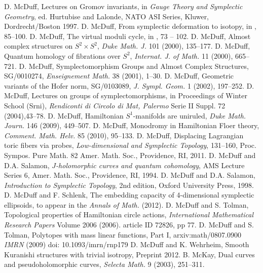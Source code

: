  D. McDuff, Lectures on Gromov invariants, in \emph{Gauge Theory and Symplectic Geometry}, ed. Hurtubise and Lalonde, NATO ASI Series, Kluwer, Dordrecht/Boston 1997.
 D. McDuff, From symplectic deformation to isotopy, in \cite{src-385}, 85--100.
 D. McDuff, The virtual moduli cycle, in \cite{src-99}, 73 -- 102.
 D. McDuff, Almost complex structures on $S^2\times S^2$, \emph{Duke Math. J.} 101 (2000), 135--177.
 D. McDuff, Quantum homology of fibrations over $S^2$, \emph{Internat. J. of Math.} 11 (2000), 665--721.
 D. McDuff, Symplectomorphism Groups and Almost Complex Structures, SG/0010274, \emph{Enseignement Math.} 38 (2001), 1--30.
 D. McDuff, Geometric variants of the Hofer norm, SG/0103089, \emph{J. Sympl. Geom.} 1 (2002), 197--252.
 D. McDuff, Lectures on groups of symplectomorphisms, in Proceedings of Winter School (Srni), \emph{Rendiconti di Circolo di Mat, Palermo} Serie II Suppl. 72 (2004),43--78.
 D. McDuff, Hamiltonian $S^1$-manifolds are uniruled, \emph{Duke Math. Journ.} 146 (2009), 449--507.
 D. McDuff, Monodromy in Hamiltonian Floer theory, \emph{Comment. Math. Helv.} 85 (2010), 95--133.
 D. McDuff, Displacing Lagrangian toric fibers via probes, \emph{Low-dimensional and Symplectic Topology}, 131--160, Proc. Sympos. Pure Math. 82 Amer. Math. Soc., Providence, RI, 2011.
 D. McDuff and D.A. Salamon, \emph{$J$-holomorphic curves and quantum cohomology}, AMS Lecture Series 6, Amer. Math. Soc., Providence, RI, 1994.
 D. McDuff and D.A. Salamon, \emph{Introduction to Symplectic Topology}, 2nd edition, Oxford University Press, 1998.
 D. McDuff and F. Schlenk, The embedding capacity of 4-dimensional symplectic ellipsoids, to appear in the \emph{Annals of Math.} (2012).
 D. McDuff and S. Tolman, Topological properties of Hamiltonian circle actions, \emph{International Mathematical Research Papers} Volume 2006 (2006). article ID 72826, pp 77.
 D. McDuff and S. Tolman, Polytopes with mass linear functions, Part I, arxiv:math/0807.0900 \emph{IMRN} (2009) doi: 10.1093/imrn/rnp179
 D. McDuff and K. Wehrheim, Smooth Kuranishi structures with trivial isotropy, Preprint 2012.
 B. McKay, Dual curves and pseudoholomorphic curves, \emph{Selecta Math.} 9 (2003), 251--311.
